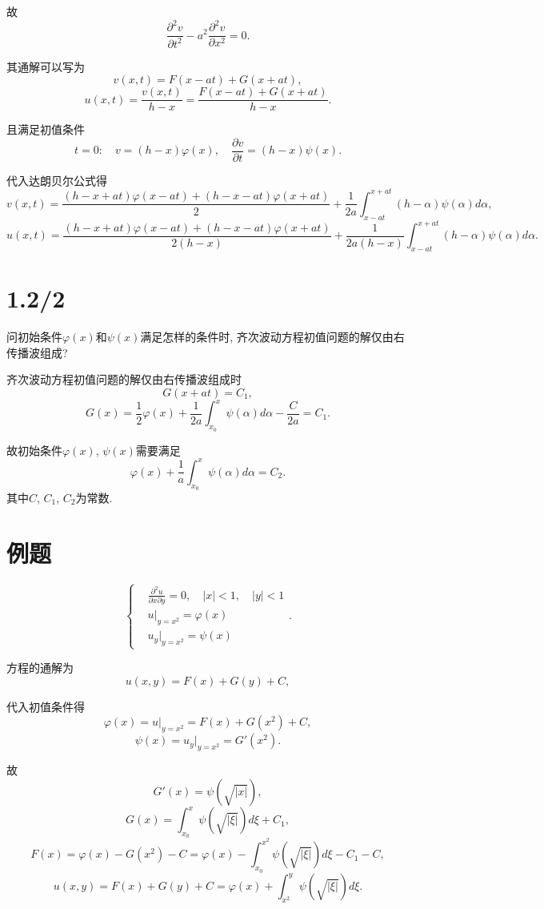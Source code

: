\documentclass[11pt,a4paper]{article}
\begin{document}
故
$$\frac{\partial^2 v}{\partial t^2}-a^2\frac{\partial^2 v}{\partial x^2}=0.$$

其通解可以写为
$$v(x,t)=F(x-at)+G(x+at),$$
$$u(x,t)=\frac{v(x,t)}{h-x}=\frac{F(x-at)+G(x+at)}{h-x}.$$

且满足初值条件
$$t=0:\quad v=(h-x)\varphi(x),\quad \frac{\partial v}{\partial t}=(h-x)\psi(x).$$

代入达朗贝尔公式得
$$v(x,t)=\frac{(h-x+at)\varphi(x-at)+(h-x-at)\varphi(x+at)}{2}+\frac{1}{2a}\int_{x-at}^{x+at}(h-\alpha)\psi(\alpha)d\alpha,$$
$$u(x,t)=\frac{(h-x+at)\varphi(x-at)+(h-x-at)\varphi(x+at)}{2(h-x)}+\frac{1}{2a(h-x)}\int_{x-at}^{x+at}(h-\alpha)\psi(\alpha)d\alpha.$$

\section{1.2/2}
\begin{problem}
问初始条件$\varphi(x)$和$\psi(x)$满足怎样的条件时, 齐次波动方程初值问题的解仅由右传播波组成?
\end{problem}

齐次波动方程初值问题的解仅由右传播波组成时
$$G(x+at)=C_1,$$
$$G(x)=\frac{1}{2}\varphi(x)+\frac{1}{2a}\int_{x_0}^x\psi(\alpha)d\alpha-\frac{C}{2a}=C_1.$$

故初始条件$\varphi(x)$, $\psi(x)$需要满足
$$\varphi(x)+\frac{1}{a}\int_{x_0}^x\psi(\alpha)d\alpha=C_2.$$
其中$C$, $C_1$, $C_2$为常数.

\section*{例题}
\begin{problem}
$$\left\{\begin{aligned}
     & \frac{\partial^2u}{\partial x\partial y}=0,\quad |x|<1,\quad |y|<1 \\
     & u|_{y=x^2}=\varphi(x)                                              \\
     & u_y|_{y=x^2}=\psi(x)
  \end{aligned}\right..$$
\end{problem}

方程的通解为
$$u(x,y)=F(x)+G(y)+C,$$

代入初值条件得
$$\varphi(x)=u|_{y=x^2}=F(x)+G(x^2)+C,$$
$$\psi(x)=u_y|_{y=x^2}=G'(x^2).$$

故
$$G'(x)=\psi(\sqrt{|x|}),$$
$$G(x)=\int_{x_0}^x\psi(\sqrt{|\xi|})d\xi+C_1,$$
$$F(x)=\varphi(x)-G(x^2)-C=\varphi(x)-\int_{x_0}^{x^2}\psi(\sqrt{|\xi|})d\xi-C_1-C,$$
$$u(x,y)=F(x)+G(y)+C=\varphi(x)+\int_{x^2}^{y}\psi(\sqrt{|\xi|})d\xi.$$
\end{document}
